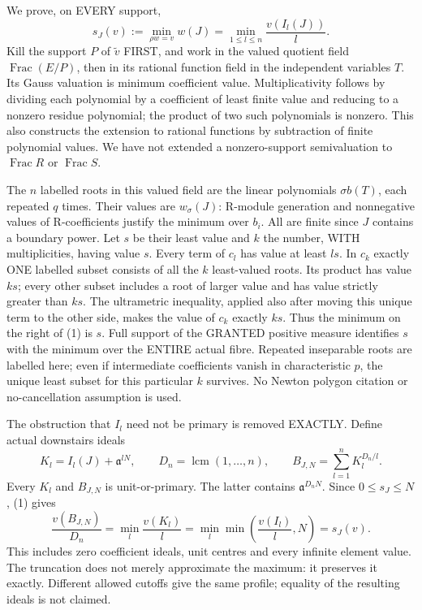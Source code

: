 We prove, on EVERY support,
\[
 s_J(v):=\min_{\rho w=v}w(J)
       =\min_{1\le l\le n}\frac{v(I_l(J))}{l}.                 \tag{1}
\]
Kill the support $P$ of $\widetilde v$ FIRST, and work in the valued
quotient field $\operatorname{Frac}(E/P)$, then in its rational function
field in the independent variables $T$. Its Gauss valuation is minimum
coefficient value. Multiplicativity follows by dividing each polynomial
by a coefficient of least finite value and reducing to a nonzero residue
polynomial; the product of two such polynomials is nonzero. This also
constructs the extension to rational functions by subtraction of finite
polynomial values. We have not extended a nonzero-support semivaluation
to $\operatorname{Frac}R$ or $\operatorname{Frac}S$.

The $n$ labelled roots in this valued field are the linear polynomials
$\sigma b(T)$, each repeated $q$ times. Their values are $w_\sigma(J)$:
R-module generation and nonnegative values of R-coefficients justify the
minimum over $b_i$. All are finite since $J$ contains a boundary power.
Let $s$ be their least value and $k$ the number, WITH multiplicities,
having value $s$. Every term of $c_l$ has value at least $ls$.
In $c_k$ exactly ONE labelled subset consists of all the $k$ least-valued
roots. Its product has value $ks$; every other subset includes a root
of larger value and has value strictly greater than $ks$.
The ultrametric inequality, applied also after moving this unique term
to the other side, makes the value of $c_k$ exactly $ks$.
Thus the minimum on the right of (1) is $s$.
Full support of the GRANTED positive measure identifies $s$ with the
minimum over the ENTIRE actual fibre. Repeated inseparable roots are
labelled here; even if intermediate coefficients vanish in characteristic
$p$, the unique least subset for this particular $k$ survives. No Newton
polygon citation or no-cancellation assumption is used.

The obstruction that $I_l$ need not be primary is removed EXACTLY.
Define actual downstairs ideals
\[
 K_l=I_l(J)+\mathfrak a^{lN},\qquad
 D_n=\operatorname{lcm}(1,\ldots,n),\qquad
 B_{J,N}=\sum_{l=1}^n K_l^{D_n/l}.
\]
Every $K_l$ and $B_{J,N}$ is unit-or-primary. The latter contains
$\mathfrak a^{D_nN}$. Since $0\le s_J\le N$, (1) gives
\[
 \frac{v(B_{J,N})}{D_n}
 =\min_l\frac{v(K_l)}l
 =\min_l\min\left(\frac{v(I_l)}l,N\right)=s_J(v).             \tag{2}
\]
This includes zero coefficient ideals, unit centres and every infinite
element value. The truncation does not merely approximate the maximum:
it preserves it exactly. Different allowed cutoffs give the same profile;
equality of the resulting ideals is not claimed.

